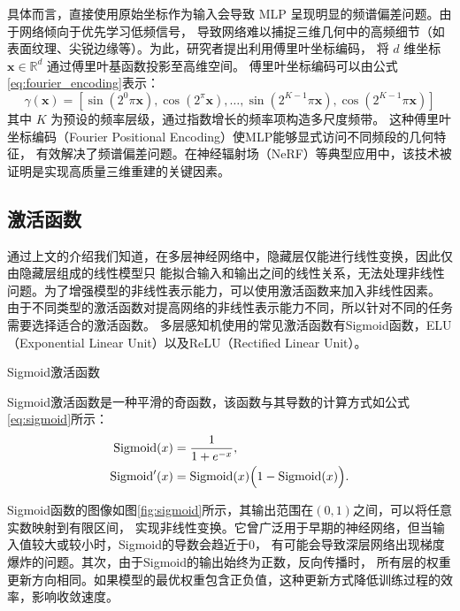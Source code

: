 具体而言，直接使用原始坐标作为输入会导致 MLP 呈现明显的频谱偏差问题\cite{pmlr-v97-rahaman19a}。由于网络倾向于优先学习低频信号，
导致网络难以捕捉三维几何中的高频细节（如表面纹理、尖锐边缘等）。为此，研究者提出利用傅里叶坐标编码，
将 $d$ 维坐标 $\mathbf{x}\in\mathbb{R}^d$ 通过傅里叶基函数投影至高维空间。
傅里叶坐标编码可以由公式\eqref{eq:fourier_encoding}表示：
\begin{equation}
\gamma(\mathbf{x})=\left[\sin\left(2^0\pi \mathbf{x}\right),\cos\left(2^\pi \mathbf{x}\right),\ldots,\sin\left(2^{K-1}\pi \mathbf{x}\right),\cos\left(2^{K-1}\pi \mathbf{x}\right)\right]
\label{eq:fourier_encoding}
\end{equation}
其中 $K$ 为预设的频率层级，通过指数增长的频率项构造多尺度频带。
这种傅里叶坐标编码（Fourier Positional Encoding）使MLP能够显式访问不同频段的几何特征，
有效解决了频谱偏差问题。在神经辐射场（NeRF）等典型应用中，该技术被证明是实现高质量三维重建的关键因素。

\subsection{激活函数}

通过上文的介绍我们知道，在多层神经网络中，隐藏层仅能进行线性变换，因此仅由隐藏层组成的线性模型只
能拟合输入和输出之间的线性关系，无法处理非线性问题。为了增强模型的非线性表示能力，可以使用激活函数来加入非线性因素。
由于不同类型的激活函数对提高网络的非线性表示能力不同，所以针对不同的任务需要选择适合的激活函数。
多层感知机使用的常见激活函数有Sigmoid函数，ELU（Exponential Linear Unit）以及ReLU（Rectified Linear Unit）。

Sigmoid激活函数

Sigmoid激活函数是一种平滑的奇函数，该函数与其导数的计算方式如公式\ref{eq:sigmoid}所示：
\begin{equation}
  \begin{aligned}
  \text{Sigmoid}(x) &= \frac{1}{1+e^{-x}}, \\
  \text{Sigmoid}'(x) &= \text{Sigmoid}(x)\Bigl(1-\text{Sigmoid}(x)\Bigr).
  \end{aligned}
  \label{eq:sigmoid}
\end{equation}

Sigmoid函数的图像如图\ref{fig:sigmoid}所示，其输出范围在$(0,1)$之间，可以将任意实数映射到有限区间，
实现非线性变换。它曾广泛用于早期的神经网络，但当输入值较大或较小时，Sigmoid的导数会趋近于0，
有可能会导致深层网络出现梯度爆炸的问题。其次，由于Sigmoid的输出始终为正数，反向传播时，
所有层的权重更新方向相同。如果模型的最优权重包含正负值，这种更新方式降低训练过程的效率，影响收敛速度。

